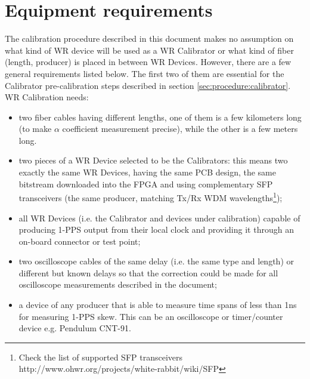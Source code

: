 \section{Equipment requirements}

The calibration procedure described in this document makes no assumption on what 
kind of WR device will be used as a WR Calibrator or what kind of fiber (length, 
producer) is placed in between WR Devices. However, there are a few general 
requirements listed below. The first two of them are essential for the
Calibrator pre-calibration steps described in section
\ref{sec:procedure:calibrator}.\\

WR Calibration needs:
\begin{itemize}
	\item two fiber cables having different lengths, one of them is a few
		kilometers long (to make $\alpha$ coefficient measurement precise), while
		the other is a few meters long.
	\item two pieces of a WR Device selected to be the Calibrators: this means two
		exactly the same WR Devices, having the same PCB design, the same bitstream
		downloaded into the FPGA and using complementary SFP transceivers (the same
		producer, matching Tx/Rx WDM wavelengths\footnote{Check the list of
		supported SFP transceivers http://www.ohwr.org/projects/white-rabbit/wiki/SFP});
	\item all WR Devices (i.e. the Calibrator and devices under calibration)
		capable of producing 1-PPS output from their local clock 
		and providing it through an on-board connector or test point;
	\item two oscilloscope cables of the same delay (i.e. the same type and
		length) or different but known delays so that the correction
		could be made for all oscilloscope measurements described in
		the document;
	\item a device of any producer that is able to measure time
		spans of less than 1ns for measuring 1-PPS skew. This can be an oscilloscope or timer/counter device e.g. Pendulum CNT-91.
\end{itemize}
